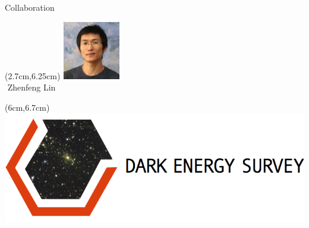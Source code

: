 \documentclass[12pt]{beamer}
\newcommand{\w}{1in}
\newcommand{\h}{1in}
\begin{document}
\begin{frame}{Collaboration}
  \begin{textblock*}{3cm}(2.7cm,6.25cm) %
\includegraphics[width=\w,height=\h]{figs/zhenfeng.jpg}\\
$\, \, $Zhenfeng Lin
\end{textblock*}


  \begin{textblock*}{3cm}(6cm,6.7cm) %
\includegraphics[scale=.45]{figs/des_logo.png}\\
\end{textblock*}

  

\end{frame}
\end{document}
